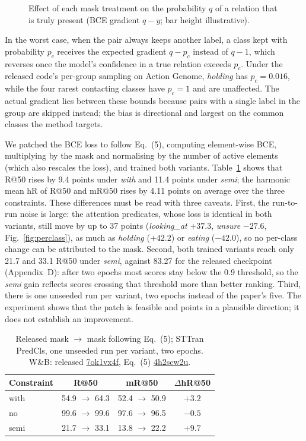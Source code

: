 \documentclass[conference,a4paper]{IEEEtran}
\newcommand{\wb}[2]{\href{https://wandb.ai/nhantrnh-graphml/#1}{{\normalfont\ttfamily #2}}}
\begin{document}
\begin{figure}[!t]
\centering
\resizebox{\columnwidth}{!}{}
\caption{Effect of each mask treatment on the probability $q$ of a relation that is truly present (BCE gradient $q-y$; bar height illustrative).}
\label{fig:maskgrad}
\end{figure}

In the worst case, when the pair always keeps another label, a class kept with
probability $p_c$ receives the expected gradient $q-p_c$ instead of $q-1$, which reverses
once the model's confidence in a true relation exceeds $p_c$. Under the released code's
per-group sampling on Action Genome, \emph{holding} has $p_c=0.016$, while the four rarest
contacting classes have $p_c=1$ and are unaffected. The actual gradient lies between these
bounds because pairs with a single label in the group are skipped instead; the bias is
directional and largest on the common classes the method targets.

We patched the BCE loss to follow Eq.~(5), computing element-wise BCE, multiplying by
the mask and normalising by the number of active elements (which also rescales the loss),
and trained both variants. Table~\ref{tab:patch} shows that R@50 rises by 9.4 points under
\emph{with} and 11.4 points under \emph{semi}; the harmonic mean hR of R@50 and mR@50 rises
by 4.11 points on average over the three constraints. These differences must be read with
three caveats. First, the run-to-run noise is large: the attention predicates, whose loss is
identical in both variants, still move by up to 37 points (\emph{looking\_at} $+37.3$,
\emph{unsure} $-27.6$, Fig.~\ref{fig:perclass}), as much as \emph{holding} ($+42.2$) or
\emph{eating} ($-42.0$), so no per-class change can be attributed to the mask. Second, both
trained variants reach only 21.7 and 33.1 R@50 under \emph{semi}, against 83.27 for the
released checkpoint (Appendix~D): after two epochs most scores stay below the 0.9 threshold, so the
\emph{semi} gain reflects scores crossing that threshold more than better ranking. Third,
there is one unseeded run per variant, two epochs instead of the paper's five. The
experiment shows that the patch is feasible and points in a plausible direction; it does
not establish an improvement.

\begin{table}[!t]
\centering
\caption{Released mask $\to$ mask following Eq.~(5); STTran PredCls, one unseeded run per variant, two epochs. W\&B: released \wb{impartail-repro/runs/7ok1vx4f}{7ok1vx4f}, Eq.~(5) \wb{impartail-repro/runs/4h2scw2u}{4h2scw2u}.}
\label{tab:patch}
\small
\setlength{\tabcolsep}{3pt}
\begin{tabular}{lccc}
\toprule
Constraint & R@50 & mR@50 & $\Delta$hR@50\\
\midrule
with & 54.9 $\to$ 64.3 & 52.4 $\to$ 50.9 & $+3.2$\\
no & 99.6 $\to$ 99.6 & 97.6 $\to$ 96.5 & $-0.5$\\
semi & 21.7 $\to$ 33.1 & 13.8 $\to$ 22.2 & $+9.7$\\
\bottomrule
\end{tabular}
\end{table}
\end{document}
